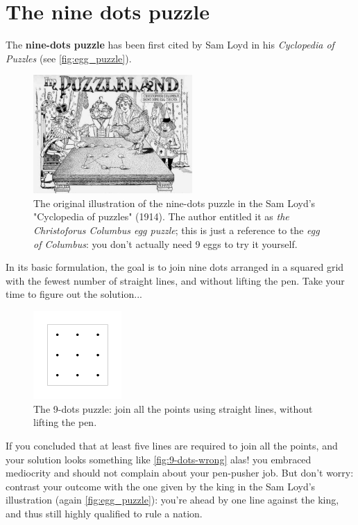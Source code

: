 \documentclass[11pt]{article}
\begin{document}
\newpage

\hypertarget{nine-dots-puzzle} {
	\section{The nine dots puzzle}
	\label{nine-dots-puzzle}
}
The \textbf{nine-dots puzzle} has been first cited by Sam Loyd in his \emph{Cyclopedia of Puzzles} (see \autoref{fig:egg_puzzle}).
\begin{figure}[H]
	\centering
	\includegraphics[width=0.54\textwidth]{images/egg_puzzle.jpg}
	\caption{The original illustration of the nine-dots puzzle in the Sam Loyd's "Cyclopedia of puzzles" (1914). The author entitled it as \emph{the Christoforus Columbus egg puzzle}; this is just a reference to the \emph{egg of Columbus}: you don't actually need 9 eggs to try it yourself.}
\label{fig:egg_puzzle}
\end{figure}
In its basic formulation, the goal is to join nine dots arranged in a squared grid with the fewest number of straight lines, and without lifting the pen. Take your time to figure out the solution...
\begin{figure}[H]
\centering
\includegraphics[width=0.3\textwidth]{images/9-dots-grid.png}
\caption{The 9-dots puzzle: join all the points using straight lines, without lifting the pen.}
\label{fig:9-dots-grid}
\end{figure}
If you concluded that at least five lines are required to join all the points, and your solution looks something like \autoref{fig:9-dots-wrong} alas! you embraced mediocrity and should not complain about your pen-pusher job. But don't worry: contrast your outcome with the one given by the king in the Sam Loyd's illustration (again \autoref{fig:egg_puzzle}): you're ahead by one line against the king, and thus still highly qualified to rule a nation.
\end{document}
